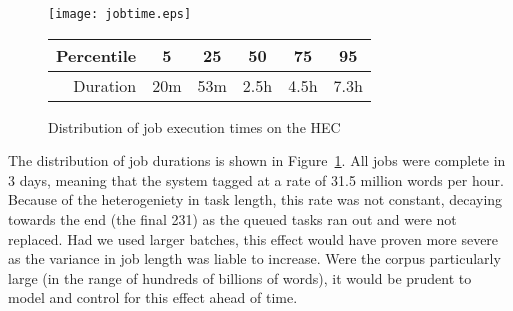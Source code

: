 % 
% 
% 
% 
% 

\begin{figure}[h]
    \centering
    \texttt{[image: jobtime.eps]}

    \begin{tabular}{ | r | c | c | c | c | c | }
        \hline
        Percentile & 5 & 25 & 50 & 75 & 95 \\ \hline
        Duration & 20m & 53m & 2.5h & 4.5h & 7.3h \\ \hline
    \end{tabular}

    \caption{Distribution of job execution times on the HEC}
    \label{fig:jobtimes}
\end{figure}


% 
% 
% 
% 



The distribution of job durations is shown in Figure~\ref{fig:jobtimes}.  All jobs were complete in 3 days, meaning that the system tagged at a rate of 31.5 million words 
per hour. Because of the heterogeniety in task length, this rate was not constant, decaying towards the end (the final 231) as the queued tasks ran out and were not replaced.  Had we used larger batches, this effect would have proven more severe as the variance in job length was liable to increase.  Were the corpus particularly large (in the range of hundreds of billions of words), it would be prudent to model and control for this effect ahead of time.

